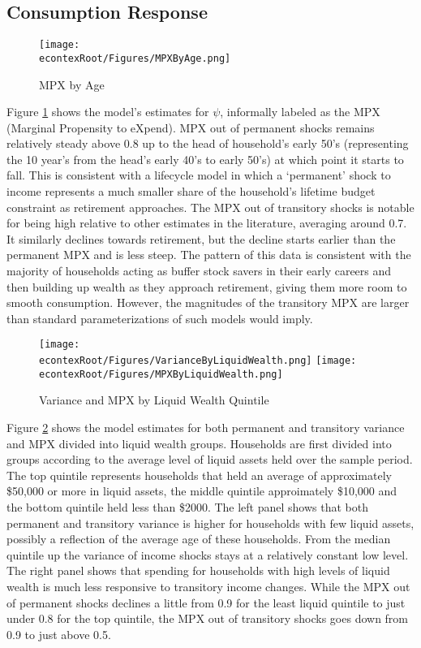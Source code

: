 \documentclass[titlepage]{\econtex}\newcommand{\texname}{IncomeUncertainty}
\begin{document}
\subsection{Consumption Response}
\begin{figure} 
	\begin{centering}
		\texttt{[image: \\econtexRoot/Figures/MPXByAge.png]} 
		\caption{MPX by Age}
		\label{fig:MPXByAge}
	\end{centering}
\end{figure}
Figure \ref{fig:MPXByAge} shows the model's estimates for $\psi$, informally labeled as the MPX (Marginal Propensity to eXpend). MPX out of permanent shocks remains relatively steady above 0.8 up to the head of household's early 50's (representing the 10 year's from the head's early 40's to early 50's) at which point it starts to fall. This is consistent with a lifecycle model in which a `permanent' shock to income represents a much smaller share of the household's lifetime budget constraint as retirement approaches. The MPX out of transitory shocks is notable for being high relative to other estimates in the literature, averaging around 0.7. It similarly declines towards retirement, but the decline starts earlier than the permanent MPX and is less steep. The pattern of this data is consistent with the majority of households acting as buffer stock savers in their early careers and then building up wealth as they approach retirement, giving them more room to smooth consumption. However, the magnitudes of the transitory MPX are larger than standard parameterizations of such models would imply.
\begin{figure}
	\centering
	\texttt{[image: \\econtexRoot/Figures/VarianceByLiquidWealth.png]}
	\centering
	\texttt{[image: \\econtexRoot/Figures/MPXByLiquidWealth.png]}
	\caption{Variance and MPX by Liquid Wealth Quintile}
	\label{fig:MPXByLiquidWealth}
\end{figure}

Figure \ref{fig:MPXByLiquidWealth} shows the model estimates for both permanent and transitory variance and MPX divided into liquid wealth groups. Households are first divided into groups according to the average level of liquid assets held over the sample period. The top quintile represents households that held an average of approximately \$50,000 or more in liquid assets, the middle quintile approimately \$10,000 and the bottom quintile held less than \$2000. The left panel shows that both permanent and transitory variance is higher for households with few liquid assets, possibly a reflection of the average age of these households. From the median quintile up the variance of income shocks stays at a relatively constant low level. The right panel shows that spending for households with high levels of liquid wealth is much less responsive to transitory income changes. While the MPX out of permanent shocks declines a little from 0.9 for the least liquid quintile to just under 0.8 for the top quintile, the MPX out of transitory shocks goes down from 0.9 to just above 0.5.
\end{document}
